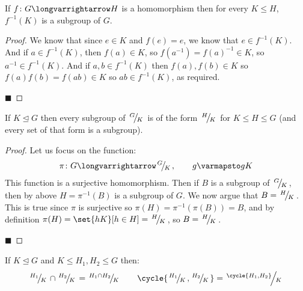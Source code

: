 \documentclass[10pt]{article}
\def\slfrac#1#2{\left.{}^{#1}\mkern-4mu\middle/\mkern-3mu{}_{#2}\right.}
\let\normalsub=\trianglelefteq
\begin{document}
\begin{lemm*}

    If $f\colon G\longvarrightarrow H$ is a homomorphism then for every $K\leq H$, $f^{-1}(K)$ is a subgroup of $G$.

\end{lemm*}

\begin{proof}

    We know that since $e\in K$ and $f(e)=e$, we know that $e\in f^{-1}(K)$.
    And if $a\in f^{-1}(K)$, then $f(a)\in K$, so $f(a^{-1})=f(a)^{-1}\in K$, so $a^{-1}\in f^{-1}(K)$.
    And if $a,b\in f^{-1}(K)$ then $f(a),f(b)\in K$ so $f(a)f(b)=f(ab)\in K$ so $ab\in f^{-1}(K)$, as required.

    \hfill$\blacksquare$

\end{proof}

\begin{lemm*}

    If $K\normalsub G$ then every subgroup of $\slfrac GK$ is of the form $\slfrac HK$ for $K\leq H\leq G$ (and every set of that form is a subgroup).

\end{lemm*}

\begin{proof}

    Let us focus on the function:
    \[ \pi\colon G\longvarrightarrow\slfrac GK,\qquad g\varmapsto gK \]
    This function is a surjective homomorphism.
    Then if $B$ is a subgroup of $\slfrac GK$, then by above $H=\pi^{-1}(B)$ is a subgroup of $G$.
    We now argue that $B=\slfrac HK$.
    This is true since $\pi$ is surjective so $\pi(H)=\pi^{-1}(\pi(B))=B$, and by definition $\pi(H)=\set{hK}[h\in H]=\slfrac HK$, so $B=\slfrac HK$.

    \hfill$\blacksquare$

\end{proof}

\begin{lemm*}

    If $K\normalsub G$ and $K\leq H_1,H_2\leq G$ then:
    \[ \slfrac{H_1}K\cap\slfrac{H_2}K = \slfrac{H_1\cap H_2}K \qquad \cycle{\slfrac{H_1}K, \slfrac{H_2}K}=\slfrac{\cycle{H_1,H_2}}K \]

\end{lemm*}
\end{document}
